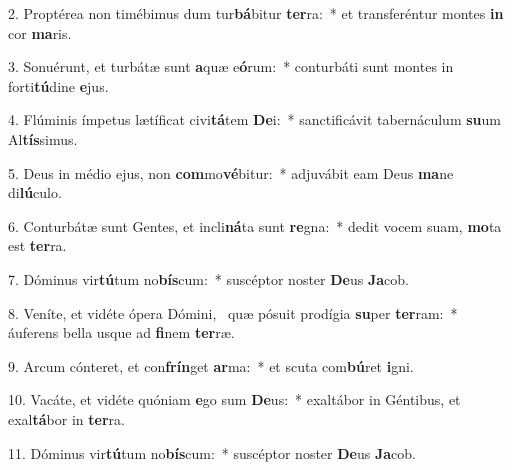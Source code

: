 2. Proptérea non timébimus dum tur\textbf{bá}bitur \textbf{ter}ra:~*  et transferéntur montes \textbf{in} cor \textbf{ma}ris.\

3. Sonuérunt, et turbátæ sunt \textbf{a}quæ e\textbf{ó}rum:~*  conturbáti sunt montes in forti\textbf{tú}dine \textbf{e}jus.\

4. Flúminis ímpetus lætíficat civi\textbf{tá}tem \textbf{De}i:~*  sanctificávit tabernáculum \textbf{su}um Al\textbf{tís}simus.\

5. Deus in médio ejus, non \textbf{com}mo\textbf{vé}bitur:~*  adjuvábit eam Deus \textbf{ma}ne di\textbf{lú}culo.\

6. Conturbátæ sunt Gentes, et incli\textbf{ná}ta sunt \textbf{re}gna:~*  dedit vocem suam, \textbf{mo}ta est \textbf{ter}ra.\

7. Dóminus vir\textbf{tú}tum no\textbf{bís}cum:~*  suscéptor noster \textbf{De}us \textbf{Ja}cob.\

8. Veníte, et vidéte ópera Dómini, \dag\  quæ pósuit prodígia \textbf{su}per \textbf{ter}ram:~*  áuferens bella usque ad \textbf{fi}nem \textbf{ter}ræ.\

9. Arcum cónteret, et con\textbf{frín}get \textbf{ar}ma:~*  et scuta com\textbf{bú}ret \textbf{i}gni.\

10. Vacáte, et vidéte quóniam \textbf{e}go sum \textbf{De}us:~*  exaltábor in Géntibus, et exal\textbf{tá}bor in \textbf{ter}ra.\

11. Dóminus vir\textbf{tú}tum no\textbf{bís}cum:~*  suscéptor noster \textbf{De}us \textbf{Ja}cob.\

